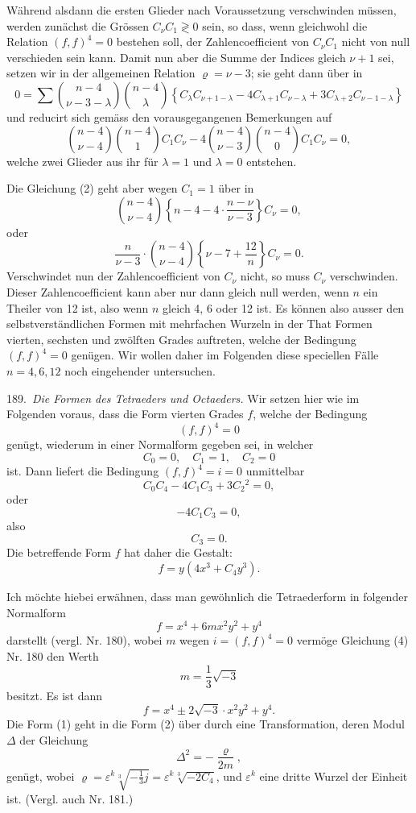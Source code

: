 \documentclass[11pt]{article}
\providecommand{\weberpage}[1]{}
\providecommand{\weq}[2]{\begin{equation}\tag{#1}#2\end{equation}}
\begin{document}
\weberpage{210}
Während alsdann die ersten Glieder nach Voraussetzung verschwinden
müssen, werden zunächst die Grössen $C_\nu C_1 \gtrless 0$ sein, so dass, wenn
gleichwohl die Relation $(f,f)^4=0$ bestehen soll, der Zahlencoefficient
von $C_\nu C_1$ nicht von null verschieden sein kann. Damit nun aber die
Summe der Indices gleich $\nu+1$ sei, setzen wir in der allgemeinen
Relation $\varrho=\nu-3$; sie geht dann über in
\[
0=\sum\binom{n-4}{\nu-3-\lambda}\binom{n-4}{\lambda}\left\{C_\lambda C_{\nu+1-\lambda}-4C_{\lambda+1}C_{\nu-\lambda}+3C_{\lambda+2}C_{\nu-1-\lambda}\right\}
\]
und reducirt sich gemäss den vorausgegangenen Bemerkungen auf
\weq{2}{\binom{n-4}{\nu-4}\binom{n-4}{1}C_1C_\nu-4\binom{n-4}{\nu-3}\binom{n-4}{0}C_1C_\nu=0,}
welche zwei Glieder aus ihr für $\lambda=1$ und $\lambda=0$ entstehen.

Die Gleichung (2) geht aber wegen $C_1=1$ über in
\[
\binom{n-4}{\nu-4}\left\{n-4-4\cdot\frac{n-\nu}{\nu-3}\right\}C_\nu=0,
\]
oder
\[
\frac{n}{\nu-3}\cdot\binom{n-4}{\nu-4}\left\{\nu-7+\frac{12}{n}\right\}C_\nu=0.
\]
Verschwindet nun der Zahlencoefficient von $C_\nu$ nicht, so muss
$C_\nu$ verschwinden. Dieser Zahlencoefficient kann aber nur dann gleich
null werden, wenn $n$ ein Theiler von 12 ist, also wenn $n$ gleich 4,
6 oder 12 ist. Es können also ausser den selbstverständlichen Formen
mit mehrfachen Wurzeln in der That Formen vierten, sechsten und
zwölften Grades auftreten, welche der Bedingung $(f,f)^4=0$ genügen.
Wir wollen daher im Folgenden diese speciellen Fälle $n=4, 6, 12$
noch eingehender untersuchen.

189.\ \textit{Die Formen des Tetraeders und Octaeders.} Wir setzen hier
wie im Folgenden voraus, dass die Form vierten Grades $f$, welche
der Bedingung
\[
(f,f)^4=0
\]
genügt, wiederum in einer Normalform gegeben sei, in welcher
\[
C_0=0,\quad C_1=1,\quad C_2=0
\]
ist. Dann liefert die Bedingung $(f,f)^4=i=0$ unmittelbar
\[
C_0C_4-4C_1C_3+3C_2{}^2=0,
\]
oder
\[
-4C_1C_3=0,
\]
also
\[
C_3=0.
\]
Die betreffende Form $f$ hat daher die Gestalt:
\weq{1}{f=y(4x^3+C_4y^3).}


\weberpage{211}
Ich möchte hiebei erwähnen, dass man gewöhnlich die Tetraederform
 in folgender Normalform
\[
f=x^4+6mx^2y^2+y^4
\]
darstellt (vergl. Nr. 180), wobei $m$ wegen $i=(f,f)^4=0$ vermöge
Gleichung (4) Nr. 180 den Werth
\[
m=\frac{1}{3}\sqrt{-3}
\]
besitzt. Es ist dann
\weq{2}{f=x^4\pm 2\sqrt{-3}\cdot x^2y^2+y^4.}
Die Form (1) geht in die Form (2) über durch eine Transformation,
deren Modul $\varDelta$ der Gleichung
\[
\varDelta^2=-\frac{\varrho}{2m},
\]
genügt, wobei $\varrho=\varepsilon^k\sqrt[3]{-\frac{1}{3}j}=\varepsilon^k\sqrt[3]{-2C_4}$, und $\varepsilon^k$ eine dritte Wurzel
der Einheit ist. (Vergl. auch Nr. 181.)
\end{document}
